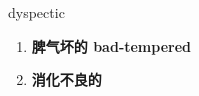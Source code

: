 
\begin{frame}
{\huge dyspectic}
\begin{center}
\begin{enumerate}\Large
  \item \textbf{脾气坏的 bad-tempered}
  \item \textbf{消化不良的}
\end{enumerate}
\end{center}
\end{frame}

